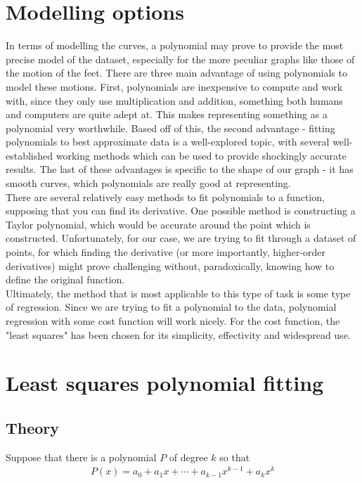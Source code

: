 \documentclass[12pt, a4paper]{article}
\begin{document}
\section{Modelling options}
In terms of modelling the curves, a polynomial may prove to provide the most
precise model of the dataset, especially for the more peculiar graphs like those
of the motion of the feet. There are three main advantage of using polynomials
to model these motions. First, polynomials are inexpensive to compute and work
with, since they only use multiplication and addition, something both humans and
computers are quite adept at. This makes representing something as a polynomial
very worthwhile. Based off of this, the second advantage - fitting polynomials
to best approximate data is a well-explored topic, with several well-established
working methods which can be used to provide shockingly accurate results. The
last of these advantages is specific to the shape of our graph - it has smooth
curves, which polynomials are really good at representing. \\

There are several relatively easy methods to fit polynomials to a function,
supposing that you can find its derivative. One possible method is constructing
a Taylor polynomial, which would be accurate around the point which is
constructed. Unfortunately, for our case, we are trying to fit through a dataset
of points, for which finding the derivative (or more importantly, higher-order
derivatives) might prove challenging without, paradoxically, knowing how to
define the original function. \\

Ultimately, the method that is most applicable to this type of task is some type
of regression. Since we are trying to fit a polynomial to the data, polynomial
regression with some cost function will work nicely. For the cost function, the
"least squares" has been chosen for its simplicity, effectivity and widespread
use.

\pagebreak
\section{Least squares polynomial fitting}
\subsection{Theory}
Suppose that there is a polynomial $P$ of degree $k$ so that
\begin{align*}
    P(x)= a_0 + a_1 x + \cdots + a_{k-1} x^{k-1} + a_k x^k
\end{align*}
\end{document}
